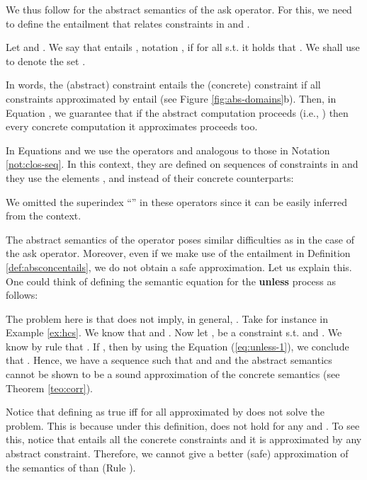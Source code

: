 \documentclass{tlp}
\begin{document}
  We  thus follow 
\cite{ZaffanellaGL97,FalaschiGMP93,Falaschi:97:TCS} for the abstract semantics of the ask operator. 
For this, we need to define the entailment  that relates constraints in  and . 

\begin{definition}[ relation]\label{def:absconcentails}
Let  and . 
We say that  entails , notation , if for all  s.t.  it holds that .  We shall use  to denote the set .
\end{definition}



In words, the (abstract) constraint  
entails the (concrete) constraint  if all constraints 
approximated by  entail  (see Figure \ref{fig:abs-domains}b).  Then, in Equation , 
we guarantee that if  the abstract computation proceeds
(i.e., ) then every concrete computation 
it approximates proceeds too. 




In Equations   and  we use the operators  and  analogous to those in  Notation \ref{not:clos-seq}.  In this context, they are defined on sequences of constraints in  and they use the elements  ,   and   instead of their concrete counterparts:
 

 We omitted the superindex ``'' in these operators since it can be easily inferred from the context. 

 


 

The abstract semantics of the  operator poses similar difficulties as in the case of the ask operator. Moreover, even if we 
make use of the entailment 
  in Definition \ref{def:absconcentails}, we do not obtain a safe approximation. Let us explain this. 
One could think of defining  the semantic equation for the {\bf unless} process as follows:

The problem here is that   does not imply, in general,     . 
Take for instance  in Example \ref{ex:hcs}. We know that   and . 
Now let  ,  be a constraint s.t. 
and . 
 We know by rule  that  . If , then 
by using the Equation (\ref{eq:unless-1}), we conclude that 
. Hence, we have a sequence  such that   and  and the abstract semantics cannot be shown to be   a sound approximation of the concrete semantics (see Theorem \ref{teo:corr}). 



Notice that defining  as true iff  
for  all  approximated by     does not solve the problem. This is  because 
under this definition,    does not hold 
for any  and . To see this, notice that  
 entails all the concrete constraints 
and it is approximated by any abstract constraint.
Therefore,  we cannot give a better (safe) approximation of the semantics of   than  (Rule ).
\end{document}
